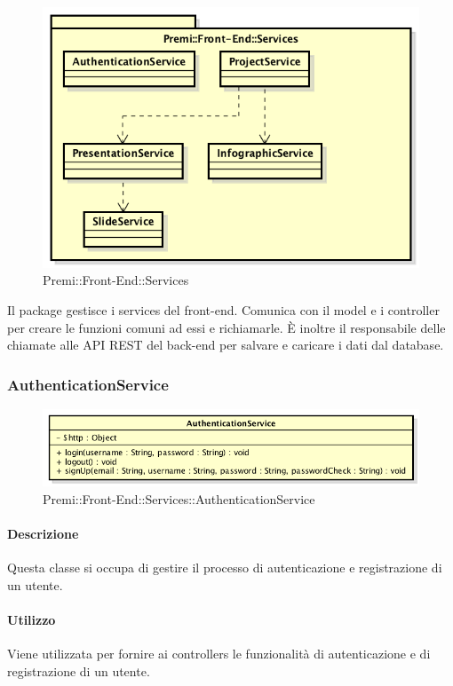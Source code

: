 \begin{figure}[h]
	\centering
	\includegraphics[width=0.7\linewidth]{img/premi_front_end_services}
	\caption[Premi::Front-End::Services]{Premi::Front-End::Services}
\end{figure}
Il package gestisce i services del front-end. Comunica con il model e i controller per creare le funzioni comuni ad essi e richiamarle. È inoltre il responsabile delle chiamate alle API REST del back-end per salvare e caricare i dati dal database.

\subsubsection{AuthenticationService}
	\begin{figure}[h]
		\centering
		\includegraphics[width=0.6\linewidth]{img/premi_front_end_services_authenticationservice}
		\caption[Premi::Front-End::Services::AuthenticationService]{Premi::Front-End::Services::AuthenticationService}
	\end{figure}
	
	\paragraph{Descrizione}
	Questa classe si occupa di gestire il processo di autenticazione e registrazione di un utente.
	
	\paragraph{Utilizzo}
	Viene utilizzata per fornire ai controllers le funzionalità di autenticazione e di registrazione di un utente.
	
